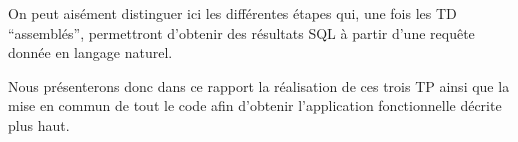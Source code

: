 On peut aisément distinguer ici les différentes étapes qui, une fois les TD ``assemblés'', permettront d'obtenir des résultats SQL à partir d'une requête donnée en langage naturel.

\medskip

Nous présenterons donc dans ce rapport la réalisation de ces trois TP ainsi que la mise en commun de tout le code afin d'obtenir l'application fonctionnelle décrite plus haut.
